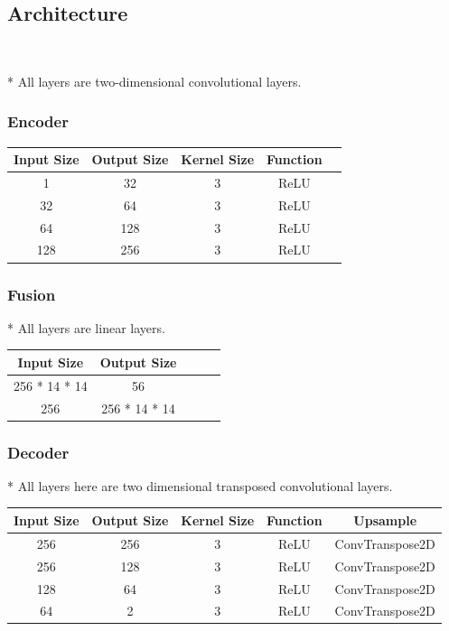 \documentclass{article}
\begin{document}

\subsection{Architecture}

\

* All layers are two-dimensional convolutional layers.

\subsubsection{Encoder}

{\Large
\begin{center}
\begin{tabular}{ |c|c|c|c|c| } 
\hline
Input Size & Output Size & Kernel Size & Function  \\
\hline
1 & 32 & 3 & ReLU \\ 
32 & 64 & 3 & ReLU  \\ 
64 & 128 & 3 & ReLU \\ 
128 & 256 & 3 & ReLU \\ 

\hline
\end{tabular}
\end{center}
}
\pagebreak
\subsubsection{Fusion}

* All layers are linear layers.

{\Large
\begin{center}
\begin{tabular}{ |c|c|c|c|c| } 
\hline
Input Size & Output Size  \\
\hline
256 * 14 * 14 & 56 \\ 
256 & 256 * 14 * 14 \\ 

\hline
\end{tabular}
\end{center}
}

\subsubsection{Decoder}

* All layers here are two dimensional transposed convolutional layers.

{\Large
\begin{center}
\begin{tabular}{ |c|c|c|c|c| } 
\hline
Input Size & Output Size & Kernel Size & Function & Upsample \\
\hline
256 & 256 & 3 & ReLU & ConvTranspose2D \\ 
256 & 128 & 3 & ReLU & ConvTranspose2D \\ 
128 & 64 & 3 & ReLU &  ConvTranspose2D \\ 
64 & 2 & 3 & ReLU & ConvTranspose2D \\ 
\hline
\end{tabular}
\end{center}
}
\end{document}
